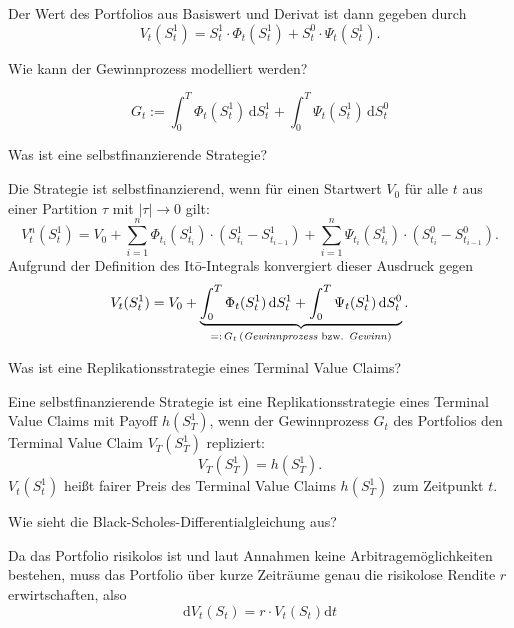 \begin{QandA}
\begin{answered}
        Der Wert des Portfolios aus Basiswert und Derivat ist dann gegeben durch
        \[
            V_t(S_t^1) = S_t^1 \cdot \Phi_t(S_t^1) + S_t^0 \cdot \Psi_t(S_t^1).
        \]
    \end{answered}

    \item Wie kann der Gewinnprozess modelliert werden?
    \begin{answered}
        \[
            G_t := \int_{0}^{T} \Phi_t(S_t^1) \, \mathrm{d}S_t^1 + \int_{0}^{T}  \Psi_t(S_t^1) \, \mathrm{d}S_t^0
        \]
    \end{answered}

    \item Was ist eine selbstfinanzierende Strategie?
    \begin{answered}
        Die Strategie ist selbstfinanzierend, wenn für einen Startwert $V_0$ für alle $t$ aus einer Partition $\tau$ mit $|\tau| \to 0$ gilt:
        \[
            V_t^n(S_t^1) = V_0 + \sum_{i = 1}^{n} \Phi_{t_i}(S_{t_i}^1) \cdot (S_{t_i}^1 - S_{t_{i - 1}}^1) + \sum_{i = 1}^{n} \Psi_{t_i}(S_{t_i}^1) \cdot (S_{t_i}^0 - S_{t_{i - 1}}^0).
        \]
        Aufgrund der Definition des Itō-Integrals konvergiert dieser Ausdruck gegen
        \[
            V_t(S_t^1) = V_0 + \underbrace{\int_{0}^{T} \Phi_t(S_t^1) \, \mathrm{d}S_t^1 + \int_{0}^{T}  \Psi_t(S_t^1) \, \mathrm{d}S_t^0}_{=: \, G_t \, \text{(\emph{Gewinnprozess} bzw. \emph{Gewinn})}}.
        \]
    \end{answered}

    \item Was ist eine Replikationsstrategie eines Terminal Value Claims?
    \begin{answered}
        Eine selbstfinanzierende Strategie ist eine Replikationsstrategie eines Terminal Value Claims mit Payoff $h(S_T^1)$, wenn der Gewinnprozess $G_t$ des Portfolios den Terminal Value Claim $V_T(S_T^1)$ repliziert:
        \[
            V_T(S_T^1) = h(S_T^1).
        \]
        $V_t(S_t^1)$ heißt fairer Preis des Terminal Value Claims $h(S_T^1)$ zum Zeitpunkt $t$.
    \end{answered}

    \item Wie sieht die Black-Scholes-Differentialgleichung aus?
    \begin{answered}
        Da das Portfolio risikolos ist und laut Annahmen keine Arbitragemöglichkeiten bestehen, muss das Portfolio über kurze Zeiträume genau die risikolose Rendite $r$ erwirtschaften, also
        \[
            \mathrm{d} V_t(S_t) = r \cdot V_t(S_t) \mathrm{d} t
        \]


\end{answered}
\end{QandA}
